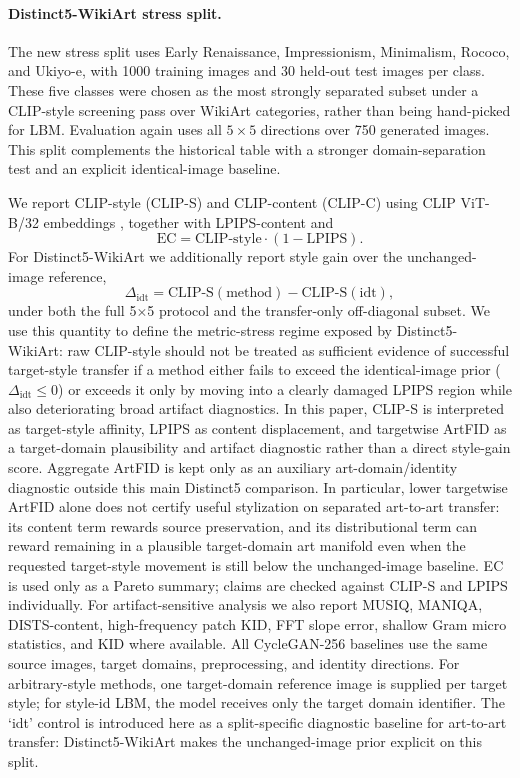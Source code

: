 \documentclass[letterpaper]{article}
\begin{document}
\paragraph{Distinct5-WikiArt stress split.}
The new stress split uses Early Renaissance, Impressionism, Minimalism, Rococo, and Ukiyo-e, with 1000 training images and 30 held-out test images per class. These five classes were chosen as the most strongly separated subset under a CLIP-style screening pass over WikiArt categories, rather than being hand-picked for LBM. Evaluation again uses all $5\times5$ directions over 750 generated images. This split complements the historical table with a stronger domain-separation test and an explicit identical-image baseline.

We report CLIP-style (CLIP-S) and CLIP-content (CLIP-C) using CLIP ViT-B/32 embeddings \cite{radford2021clip}, together with LPIPS-content and
\begin{equation}
    \mathrm{EC} = \mathrm{CLIP\mbox{-}style}\cdot(1-\mathrm{LPIPS}).
\end{equation}
For Distinct5-WikiArt we additionally report style gain over the unchanged-image reference,
\begin{equation}
    \Delta_{\mathrm{idt}} = \mathrm{CLIP\mbox{-}S}(\text{method}) - \mathrm{CLIP\mbox{-}S}(\text{idt}),
\end{equation}
under both the full 5$\times$5 protocol and the transfer-only off-diagonal subset. We use this quantity to define the metric-stress regime exposed by Distinct5-WikiArt: raw CLIP-style should not be treated as sufficient evidence of successful target-style transfer if a method either fails to exceed the identical-image prior ($\Delta_{\mathrm{idt}}\le 0$) or exceeds it only by moving into a clearly damaged LPIPS region while also deteriorating broad artifact diagnostics. In this paper, CLIP-S is interpreted as target-style affinity, LPIPS as content displacement, and targetwise ArtFID as a target-domain plausibility and artifact diagnostic rather than a direct style-gain score. Aggregate ArtFID is kept only as an auxiliary art-domain/identity diagnostic outside this main Distinct5 comparison. In particular, lower targetwise ArtFID alone does not certify useful stylization on separated art-to-art transfer: its content term rewards source preservation, and its distributional term can reward remaining in a plausible target-domain art manifold even when the requested target-style movement is still below the unchanged-image baseline. EC is used only as a Pareto summary; claims are checked against CLIP-S and LPIPS individually. For artifact-sensitive analysis we also report MUSIQ, MANIQA, DISTS-content, high-frequency patch KID, FFT slope error, shallow Gram micro statistics, and KID where available. All CycleGAN-256 baselines use the same source images, target domains, preprocessing, and identity directions. For arbitrary-style methods, one target-domain reference image is supplied per target style; for style-id LBM, the model receives only the target domain identifier. The `idt' control is introduced here as a split-specific diagnostic baseline for art-to-art transfer: Distinct5-WikiArt makes the unchanged-image prior explicit on this split.
\end{document}

